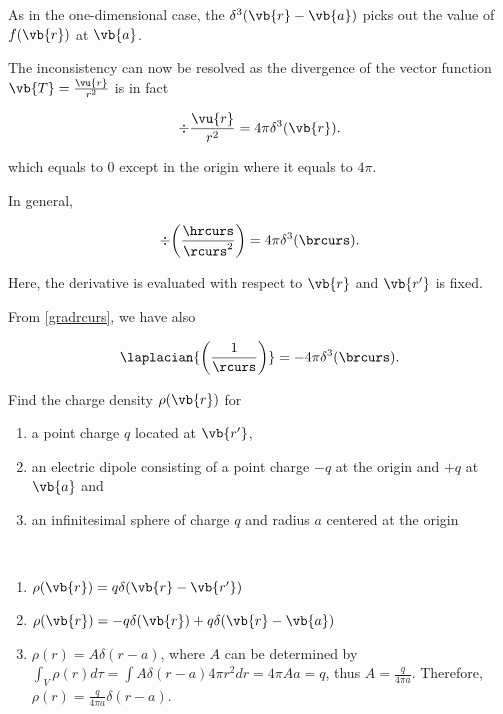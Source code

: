 \documentclass[english,a4paper,12pt]{report}
\begin{document}
As in the one-dimensional case, the \(\delta^3(\vb{r} - \vb{a})\) picks out the value of \(f(\vb{r})\) at \(\vb{a}\).
	
The inconsistency can now be resolved as the divergence of the vector function \(\vb{T} = \frac{\vu{r}}{r^2}\) is in fact
	
\begin{equation} 
	\div{\frac{\vu{r}}{r^2}} = 4\pi\delta^3(\vb{r}). 
\end{equation}
	 
which equals to 0 except in the origin where it equals to \(4\pi\).
	
In general,
	
\begin{equation} 
	\div{\left(\frac{\hrcurs}{\rcurs^2}\right)} = 4\pi\delta^3(\brcurs). \label{divdelta} 
\end{equation} 
 	
Here, the derivative is evaluated with respect to \(\vb{r}\) and \(\vb{r'}\) is fixed.
 	
From \cref{gradrcurs}, we have also
 	
\begin{equation} 
	\laplacian{\left(\frac{1}{\rcurs}\right)} = -4\pi\delta^3(\brcurs). \label{laprj} 
\end{equation}
	
{Find the charge density \(\rho(\vb{r})\) for
\begin{enumerate}
	\item a point charge  \(q\) located at \(\vb{r'}\),\\
	\item an electric dipole consisting of a point charge \(-q\) at the origin and \(+q\) at \(\vb{a}\) and\\
	\item an infinitesimal sphere of charge \(q\) and radius \(a\) centered at the origin
\end{enumerate}~}
{\begin{enumerate}
	\item \(\rho(\vb{r}) = q\delta(\vb{r} - \vb{r'}) \)\\

	\item \(\rho(\vb{r}) = -q\delta(\vb{r}) + q\delta(\vb{r} - \vb{a})\)\\	

	\item \(\rho(r) = A\delta(r - a)\), where \(A\) can be determined by \(\int_{V} \rho(r) d\tau = \int A\delta(r-a) 4\pi r^2 dr = 4\pi Aa = q\), thus \(A = \frac{q}{4\pi a}\). Therefore, \(\rho(r) = \frac{q}{4\pi a}\delta(r - a)\).
\end{enumerate}~}
\end{document}
